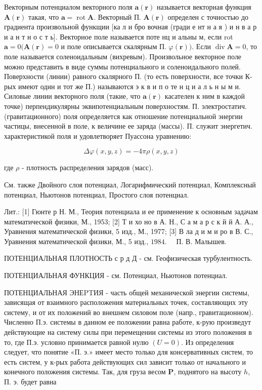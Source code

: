 \documentclass[10pt]{article}
\begin{document}
Векторным потенциалом векторного поля $\boldsymbol{a}(\boldsymbol{r})$ называется векторная функция $\boldsymbol{A}(\boldsymbol{r})$ такая, что $\boldsymbol{a}=\operatorname{rot} \boldsymbol{A}$. Векторный П. $\boldsymbol{A}(\boldsymbol{r})$ определен с точностью до градиента произвольной функщии [ка л и бро вочная (гради е нт н а я ) и н в а р и а н т н о с т ь]. Векторное поле называется поте нц и альны м, если rot $\boldsymbol{a}=0(\boldsymbol{A}(\boldsymbol{r})=0$ и поле описывается скалярным П. $\varphi(\boldsymbol{r}))$. Если $\operatorname{div} \boldsymbol{A}=0$, то поле называется соленоидальным (вихревым). Произвольное векторное поле можно представить в виде суммы потенциального и соленоидального полей. Поверхности (линии) равного скалярного П. (то есть поверхности, все точки К-рых имеют один и тот же П.) называются э к в и п о те н ц и а л ь н ы м и. Силовые линии векторного поля (такие, что $\boldsymbol{a}(\boldsymbol{r})$ касателен к ним в каждой точке) перпендикулярны эквипотенциальным поверхностям. П. электростатич. (гравитационного) поля определяется как отношение потенциальной энергии частицы, внесенной в поле, к величине ее заряда (массы). П. служит энергетич. характеристикой поля и удовлетворяет Пуассона уравнению:



\[

\Delta \varphi(x, y, z)=-4 \pi \rho(x, y, z)

\]



где $\rho$ - плотность распределения зарядов (масс).



См. также Двойного слоя потенциал, Логарифмический потенциал, Комплексный потенциал, Ньютонов потенциал, Простого слоя потенциал.



Лит.: [1] Гюнте р Н. М., Теория потенциала и ее применение к основным задачам математической физики, М., 1953; [2] Т и хо но в А. Н., С а м а р с к й й А. А., Уравнения математической физики, 5 изд., М., 1977; [3] В ла д и м и ро в В. С., Уравнения математической физики, М., 5 изд., $1984 . \quad$ П. В. Малышев.



ПОТЕНЦИАЛЬНАЯ ПЛОТНОСТЬ с р д Д - см. Геофизическая турбулентность.



ПОТЕНЦИАЛЬНАЯ ФУНКЦИЯ - см. Потенциал, Ньютонов потенциал.



ПОТЕНЦИАЛЬНАЯ ЭНЕPTИЯ - часть общей механической энергии системы, зависящая от взаимного расположения материальных точек, составляющих эту систему, и от их положений во внешнем силовом поле (напр., гравитационном). Численно П.э. системы в данном ее положении равна работе, к-рую произведут действующие на систему силы при перемещении системы из этого положения в то, где П.э. условно принимается равной нулю $(U=0)$. Из определения следует, что понятие «П. э.» имеет место только для консервативных систем, то есть систем, у к-рых работа действующих сил зависит только от начального и конечного положения системы. Так, для груза весом $\boldsymbol{P}$, поднятого на высоту $h$, П. э. будет равна
\end{document}
